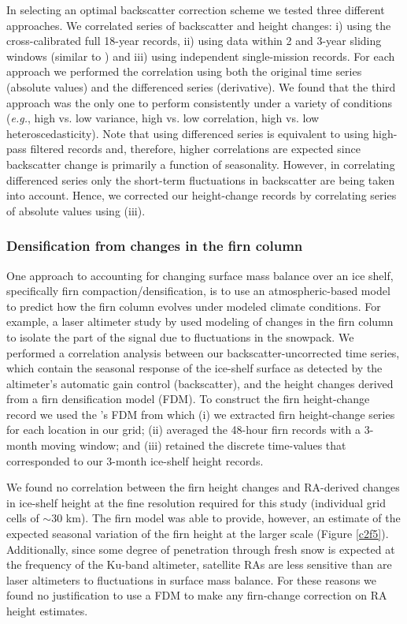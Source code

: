 In selecting an optimal backscatter correction scheme we tested three different approaches. We correlated series of backscatter and height changes: i) using the cross-calibrated full 18-year records, ii) using data within 2 and 3-year sliding windows (similar to \textcite{Khvorostovsky2012}) and iii) using independent single-mission records. For each approach we performed the correlation using both the original time series (absolute values) and the differenced series (derivative). We found that the third approach was the only one to perform consistently under a variety of conditions ({\it e.g.}, high vs. low variance, high vs. low correlation, high vs. low heteroscedasticity). Note that using differenced series is equivalent to using high-pass filtered records and, therefore, higher correlations are expected since backscatter change is primarily a function of seasonality. However, in correlating differenced series only the short-term fluctuations in backscatter are being taken into account. Hence, we corrected our height-change records by correlating series of absolute values using (iii).

\subsubsection{Densification from changes in the firn column}

One approach to accounting for changing surface mass balance over an ice shelf, specifically firn compaction/densification, is to use an atmospheric-based model to predict how the firn column evolves under modeled climate conditions. For example, a laser altimeter study by \textcite{Pritchard2012} used modeling of changes in the firn column to isolate the part of the signal due to fluctuations in the snowpack. We performed a correlation analysis between our backscatter-uncorrected time series, which contain the seasonal response of the ice-shelf surface as detected by the altimeter's automatic gain control (backscatter), and the height changes derived from a firn densification model (FDM). To construct the firn height-change record we used the \textcite{Ligtenberg2011}’s FDM from which (i) we extracted firn height-change series for each location in our grid; (ii) averaged the 48-hour firn records with a 3-month moving window; and (iii) retained the discrete time-values that corresponded to our 3-month ice-shelf height records.

We found no correlation between the firn height changes and RA-derived changes in ice-shelf height at the fine resolution required for this study (individual grid cells of $\sim$30 km). The firn model was able to provide, however, an estimate of the expected seasonal variation of the firn height at the larger scale (Figure \ref{c2f5}). Additionally, since some degree of penetration through fresh snow is expected at the frequency of the Ku-band altimeter, satellite RAs are less sensitive than are laser altimeters to fluctuations in surface mass balance. For these reasons we found no justification to use a FDM to make any firn-change correction on RA height estimates.


